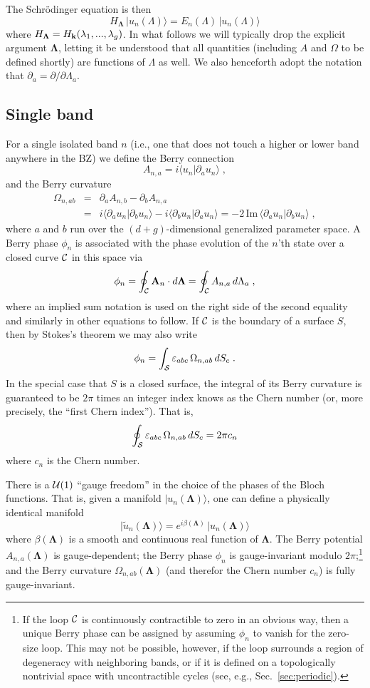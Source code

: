 \documentclass[11pt]{article}
\numberwithin{equation}{section} %
\def\nn{\nonumber\\}
\def\bea{\begin{eqnarray}}
\def\eea{\end{eqnarray}}
\def\beq{\begin{equation}}
\def\eeq{\end{equation}}
\renewcommand{\Im}{\textrm{Im}}
\def\ket#1{\vert #1 \rangle}
\def\ip#1#2{\langle #1 \vert #2 \rangle}
\def\A{{\bf A}}
\def\O{{\Omega}}
\def\pa{\partial_a}
\def\pb{\partial_b}
\def\k{{\bf k}}
\def\l{\lambda}
\def\L{\Lambda}
\def\bL{\mathbf{\Lambda}}
\def\Im{\textrm{Im}\,}
\def\cC{{\cal C}}
\def\cS{{\cal S}}
\def\ve{\varepsilon}
\begin{document}
The Schr\"odinger equation is then
%
\beq
H_\bL\,\ket{u_n(\L)} = E_n(\L)\,\ket{u_n(\L)}
\eeq
%
where $H_\bL=H_\k(\l_1,...,\l_g)$.  In what follows we will
typically drop the explicit argument $\bL$, letting it be
understood that all quantities (including $A$ and $\Omega$ to
be defined shortly) are functions of $\L$ as well.  We also
henceforth adopt the notation that $\pa=\partial/\partial\L_a$.

\subsection{Single band}

For a single isolated band $n$ (i.e., one that does not touch a
higher or lower band anywhere in the BZ) we define the Berry connection
%
\beq
A_{n,a}=i\ip{u_n}{\pa u_n} \;,
\eeq
%
and the Berry curvature
%
\bea
\O_{n,ab}&=& \pa A_{n,b}-\pb A_{n,a} \nn
   &=& i\ip{\pa u_n}{\pb u_n}-i\ip{\pb u_n}{\pa u_n}
   = -2\,\Im\ip{\pa u_n}{\pb u_n}\;,
\eea
%
where $a$ and $b$ run over the $(d+g)$-dimensional generalized
parameter space.  A Berry phase $\phi_n$ is associated with the
phase evolution of the $n$'th state over a closed curve $\cC$ in
this space via
%
\beq
\phi_n=\oint_\cC \A_n\cdot d\bL=\oint_\cC  A_{n,a}\,d\L_a \;,
\eeq
%
where an implied sum notation is used on the right side of the
second equality and similarly in other
equations to follow.  If $\cC$ is the boundary of
a surface $S$, then by Stokes's theorem we may also write
%
\beq
\phi_n=\int_\cS \ve_{abc}\,\O_{n,ab}\,dS_c \;.
\label{eq:Oint}
\eeq
%
In the special case that $S$ is a closed surface, the integral
of its Berry curvature is guaranteed to be $2\pi$ times an
integer index knows as the Chern number (or, more precisely,
the ``first Chern index'').  That is,
%
\beq
\oint_\cS \ve_{abc}\,\O_{n,ab}\,dS_c=2\pi c_n
\eeq
%
where $c_n$ is the Chern number.

There is a ${\cal U}(1)$ ``gauge freedom'' in the choice of the
phases of the Bloch functions.  That is, given a manifold
$\ket{u_n(\bL)}$, one can define a physically identical manifold
%
\beq
\ket{\tilde{u}_n(\bL)}=e^{i\beta(\bL)}\,\ket{u_n(\bL)}
\eeq
%
where $\beta(\bL)$ is a smooth and continuous real function of $\bL$.
The Berry potential $A_{n,a}(\bL)$ is gauge-dependent;
the Berry phase $\phi_n$ is gauge-invariant modulo $2\pi$;\footnote{If 
  the loop $\cC$ is continuously contractible to zero in an
  obvious way, then a unique Berry phase can be assigned by
  assuming $\phi_n$ to vanish for the zero-size loop.  This may
  not be possible, however, if the loop surrounds a region
  of degeneracy with neighboring bands, or if it is defined on
  a topologically nontrivial space with uncontractible cycles (see, e.g.,
  Sec.~\ref{sec:periodic}).}
%
and the Berry curvature $\O_{n,ab}(\bL)$ (and therefor the Chern
number $c_n$) is fully gauge-invariant.
\end{document}
